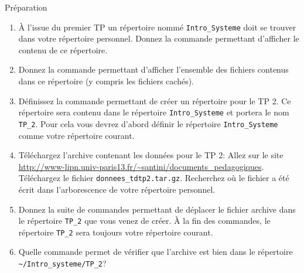    
   
   
\begin{exercice}
  \begin{exercicelet}{Préparation}
    \begin{enumerate}
    \item À l'issue du premier TP un répertoire nommé
      \verb|Intro_Systeme| doit se trouver dans votre répertoire
      personnel. Donnez la commande permettant d'afficher le contenu de
      ce répertoire.
    \item Donnez la commande permettant d'afficher l'ensemble des
      fichiers contenus dans ce répertoire (y compris les fichiers
      cachés).
    \item Définissez la commande permettant de créer un répertoire pour
      le TP 2. Ce répertoire sera contenu dans le répertoire
      \verb|Intro_Systeme| et portera le nom \verb|TP_2|. Pour cela vous
      devrez d'abord définir le répertoire \verb|Intro_Systeme| comme
      votre répertoire courant.
    \item Téléchargez l'archive contenant les données pour le TP 2:
      Allez sur le site
      \url{http://www-lipn.univ-paris13.fr/~santini/documents_pedagogiques}.
      Téléchargez le fichier \verb|donnees_tdtp2.tar.gz|. Recherchez où
      le fichier a été écrit dans l'arborescence de votre répertoire
      personnel.
    \item Donnez la suite de commandes permettant de déplacer le fichier
      archive dans le répertoire \verb|TP_2| que vous venez de créer. À
      la fin des commandes, le répertoire \verb|TP_2| sera toujours
      votre répertoire courant.
    \item Quelle commande permet de vérifier que l'archive est bien dans
      le répertoire \verb|~/Intro_systeme/TP_2|?
      \setcounter{cnti}{\value{enumi}}
    \end{enumerate}
  \end{exercicelet}
\end{exercice}
